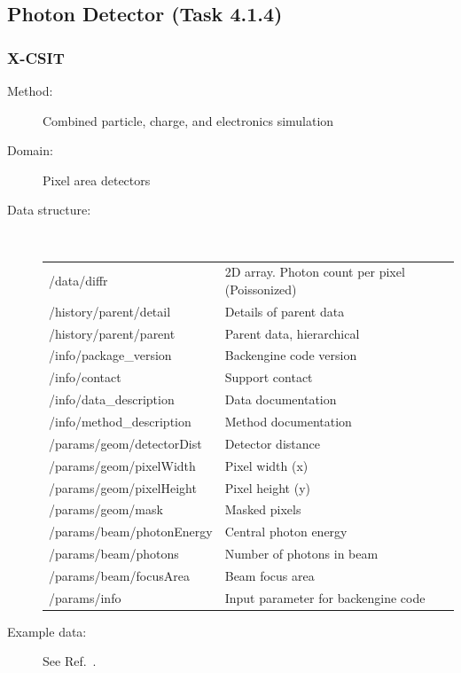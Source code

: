 \documentclass[12pt]{scrartcl}
\begin{document}
\subsection{Photon Detector (Task 4.1.4)}
\subsubsection{X-CSIT\label{sec:interface_det_xcsit}}
\begin{description}
  \item[Method:] Combined particle, charge, and electronics simulation
  \item[Domain:] Pixel area detectors
  \item[Data structure:]\ \\
{\scriptsize%
  \begin{tabular}{l|l}
    \hline
    \hline
/data/diffr        & 2D array. Photon count per pixel
(Poissonized) \\
/history/parent/detail        &  Details of parent data\\
/history/parent/parent        & Parent data, hierarchical \\
/info/package\_version        & Backengine code version \\
/info/contact        & Support contact \\
/info/data\_description        & Data documentation \\
/info/method\_description        & Method documentation \\
/params/geom/detectorDist        & Detector distance \\
/params/geom/pixelWidth        & Pixel width (x) \\
/params/geom/pixelHeight        & Pixel height (y) \\
/params/geom/mask        & Masked pixels \\
/params/beam/photonEnergy        & Central photon energy  \\
/params/beam/photons        & Number of photons in beam \\
/params/beam/focusArea        & Beam focus area \\
/params/info        & Input parameter for backengine code \\
\hline
\hline
\end{tabular}
}
\item[Example data:] See Ref.~\cite{Joy2015}.
\end{description}
%
\newpage
%
\printbibliography
%
\end{document}
